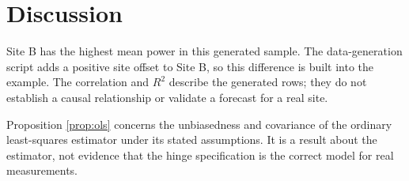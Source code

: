 \section{Discussion}
Site B has the highest mean power in this generated sample. The data-generation script adds a positive site offset to Site B, so this difference is built into the example. The correlation and $R^2$ describe the generated rows; they do not establish a causal relationship or validate a forecast for a real site.

Proposition \cref{prop:ols} concerns the unbiasedness and covariance of the ordinary least-squares estimator under its stated assumptions. It is a result about the estimator, not evidence that the hinge specification is the correct model for real measurements.

